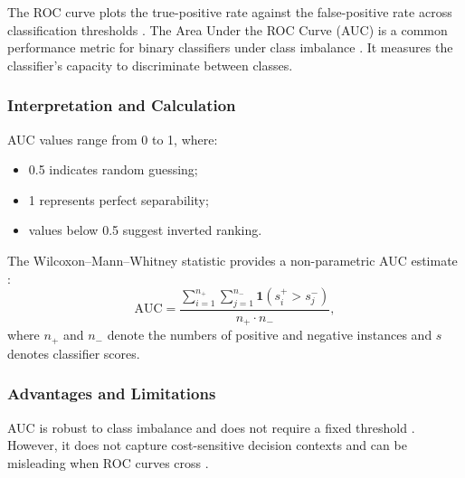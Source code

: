 The \ac{ROC} curve plots the true-positive rate against the false-positive rate across classification thresholds \parencite{hanley1982}.
The Area Under the ROC Curve (\ac{AUC}) is a common performance metric for binary classifiers under class imbalance \parencite{fawcett2006}.
It measures the classifier's capacity to discriminate between classes.

\subsubsection{Interpretation and Calculation}
\ac{AUC} values range from 0 to 1, where:
\begin{itemize}
    \item 0.5 indicates random guessing;
    \item 1 represents perfect separability;
    \item values below 0.5 suggest inverted ranking.
\end{itemize}

The Wilcoxon--Mann--Whitney statistic provides a non-parametric \ac{AUC} estimate \parencite{hanley1982}:
\begin{equation}
    \text{AUC} = \frac{\sum_{i=1}^{n_+} \sum_{j=1}^{n_-} \mathbf{1}(s_i^+ > s_j^-)}{n_+ \cdot n_-},
\end{equation}
where $n_+$ and $n_-$ denote the numbers of positive and negative instances and $s$ denotes classifier scores.

\subsubsection{Advantages and Limitations}
\ac{AUC} is robust to class imbalance and does not require a fixed threshold \parencite{bradley1997}.
However, it does not capture cost-sensitive decision contexts and can be misleading when ROC curves cross \parencite{lobo2008}.


